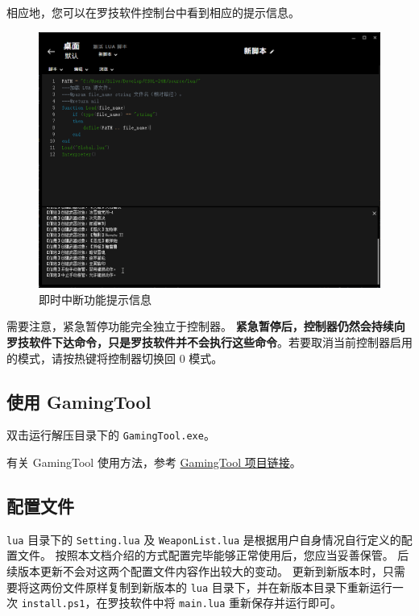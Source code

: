 相应地，您可以在罗技软件控制台中看到相应的提示信息。

\begin{figure}[H]
    \Centering
    \includegraphics[width=\textwidth]{docs/assets/interrupt.png}
    \caption{即时中断功能提示信息}
\end{figure}

需要注意，紧急暂停功能完全独立于控制器。
\textbf{紧急暂停后，控制器仍然会持续向罗技软件下达命令，只是罗技软件并不会执行这些命令}。若要取消当前控制器启用的模式，请按热键将控制器切换回 0 模式。

\subsection{使用 GamingTool}

双击运行解压目录下的 \lstinline{GamingTool.exe}。

有关 GamingTool 使用方法，参考 \href{https://gitee.com/silver1867/gaming-tool}{GamingTool 项目链接}。

\subsection{配置文件}

\lstinline{lua} 目录下的 \lstinline{Setting.lua} 及 \lstinline{WeaponList.lua} 是根据用户自身情况自行定义的配置文件。
按照本文档介绍的方式配置完毕能够正常使用后，您应当妥善保管。
后续版本更新不会对这两个配置文件内容作出较大的变动。
更新到新版本时，只需要将这两份文件原样复制到新版本的 \lstinline{lua} 目录下，并在新版本目录下重新运行一次 \lstinline{install.ps1}，在罗技软件中将 \lstinline{main.lua} 重新保存并运行即可。